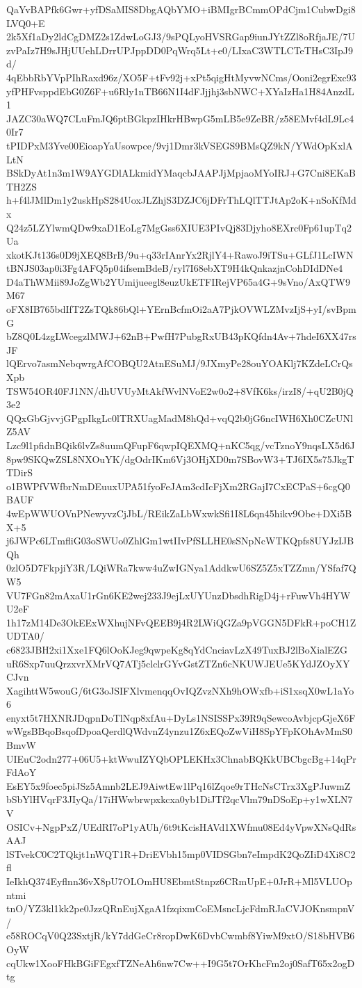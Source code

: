QaYvBAPfk6Gwr+yfDSaMIS8DbgAQbYMO+iBMIgrBCmmOPdCjm1CubwDgi8LVQ0+E
2k5Xf1aDy2ldCgDMZ2s1ZdwLoGJ3/9sPQLyoHVSRGap9iunJYtZZl8oRfjaJE/7U
zvPaIz7H9sJHjUUehLDrrUPJppDD0PqWrq5Lt+e0/LIxaC3WTLCTeTHsC3IpJ9d/
4qEbbRbYVpPIhRaxd96z/XO5F+tFv92j+xPt5qigHtMyvwNCms/Ooni2egrExc93
yfPHFvsppdEbG0Z6F+u6Rly1nTB66N1I4dFJjjhj3sbNWC+XYaIzHa1H84AnzdL1
JAZC30aWQ7CLuFmJQ6ptBGkpzIHkrHBwpG5mLB5e9ZeBR/z58EMvf4dL9Lc40Ir7
tPIDPxM3Yve00EioapYaUsowpce/9vj1Dmr3kVSEGS9BMsQZ9kN/YWdOpKxlALtN
BSkDyAt1n3m1W9AYGDlALkmidYMaqcbJAAPJjMpjaoMYoIRJ+G7Cni8EKaBTH2ZS
h+f4lJMlDm1y2uskHpS284UoxJLZhjS3DZJC6jDFrThLQlTTJtAp2oK+nSoKfMdx
Q24z5LZYlwmQDw9xaD1EoLg7MgGss6XIUE3PIvQj83Djyho8EXrc0Fp61upTq2Ua
xkotKJt136s0D9jXEQ8BrB/9u+q33rIAnrYx2RjlY4+RawoJ9iTSu+GLfJ1LcIWN
tBNJS03ap0i3Fg4AFQ5p04ifsemBdeB/ryl7I68ebXT9H4kQnkazjnCohDIdDNe4
D4aThWMii89JoZgWb2YUmijueegl8euzUkETFIRejVP65a4G+9sVno/AxQTW9M67
oFX8IB765bdIfT2ZsTQk86bQl+YErnBcfmOi2aA7PjkOVWLZMvzIjS+yI/svBpmG
bZ8Q0L4zgLWcegzlMWJ+62nB+PwfH7PubgRxUB43pKQfdn4Av+7hdeI6XX47rsJF
lQErvo7asmNebqwrgAfCOBQU2AtnESuMJ/9JXmyPe28ouYOAKlj7KZdeLCrQsXpb
TSW54OR40FJ1NN/dhUVUyMtAkfWvlNVoE2w0o2+8VfK6ks/irzI8/+qU2B0jQ3e2
QQxGbGjvvjGPgpIkgLc0lTRXUagMadM8hQd+vqQ2b0jG6ncIWH6Xh0CZcUNlZ5AV
Lzc9l1pfidnBQik6lvZs8uumQFupF6qwpIQEXMQ+nKC5qg/vcTznoY9nqsLX5d6J
8pw9SKQwZSL8NXOuYK/dgOdrIKm6Vj3OHjXD0m7SBovW3+TJ6IX5s75JkgTTDirS
o1BWPfVWfbrNmDEuuxUPA51fyoFeJAm3cdIcFjXm2RGajI7CxECPaS+6cgQ0BAUF
4wEpWWUOVnPNewyvzCjJbL/REikZaLbWxwkSfi1I8L6qn45hikv9Obe+DXi5BX+5
j6JWPc6LTmfliG03oSWUo0ZhlGm1wtIIvPfSLLHE0sSNpNcWTKQpfs8UYJzIJBQh
0zlO5D7FkpjiY3R/LQiWRa7kww4uZwIGNya1AddkwU6SZ5Z5xTZZmn/YSfaf7QW5
VU7FGn82mAxaU1rGn6KE2wej233J9ejLxUYUnzDbsdhRigD4j+rFuwVh4HYWU2eF
1h17zM14De3OkEExWXhujNFvQEEB9j4R2LWiQGZa9pVGGN5DFkR+poCH1ZUDTA0/
c6823JBH2xi1Xxe1FQ6lOoKJeg9qwpeKg8qYdCnciavLzX49TuxBJ2lBoXialEZG
uR6Sxp7uuQrzxvrXMrVQ7ATj5clclrGYvGstZTZn6cNKUWJEUe5KYdJZOyXYCJvn
XagihttW5wouG/6tG3oJSIFXlvmenqqOvIQZvzNXh9hOWxfb+iS1xsqX0wL1aYo6
enyxt5t7HXNRJDqpnDoTlNqp8xfAu+DyLs1NSISSPx39R9qSewcoAvbjcpGjeX6F
wWgsBBqoBsqofDpoaQerdlQWdvnZ4ynzu1Z6xEQoZwViH8SpYFpKOhAvMmS0BmvW
UIEuC2odn277+06U5+ktWwuIZYQbOPLEKHx3ChnabBQKkUBCbgcBg+14qPrFdAoY
EsEY5x9foec5piJSz5Amnb2LEJ9AiwtEw1lPq16lZqoe9rTHcNsCTrx3XgPJuwmZ
bSbYlHVqrF3JIyQa/17iHWwbrwpxkcxa0yb1DiJTf2qcVlm79nDSoEp+y1wXLN7V
OSICv+NgpPxZ/UEdRI7oP1yAUh/6t9tKcisHAVd1XWfmu08Ed4yVpwXNsQdRsAAJ
lSTvekC0C2TQkjt1nWQT1R+DriEVbh15mp0VIDSGbn7eImpdK2QoZIiD4Xi8C2fl
IeIkhQ374Eyflnn36vX8pU7OLOmHU8EbmtStnpz6CRmUpE+0JrR+Ml5VLUOpntmi
tnO/YZ3kl1kk2pe0JzzQRnEujXgaA1fzqixmCoEMsncLjcFdmRJaCVJOKnsmpnV/
e58ROCqV0Q23SxtjR/kY7ddGeCr8ropDwK6DvbCwmbf8YiwM9xtO/S18bHVB6OyW
cqUkw1XooFHkBGiFEgxfTZNeAh6nw7Cw++I9G5t7OrKhcFm2oj0SafT65x2ogDtg
